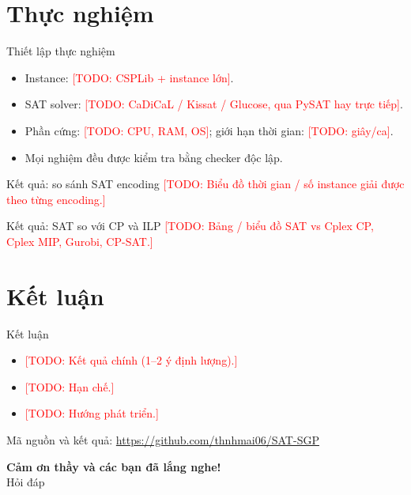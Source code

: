 \documentclass[aspectratio=169,11pt]{beamer}
\newcommand{\TODO}[1]{\textcolor{red}{[TODO: #1]}}
\newcommand{\RepositoryURL}{https://github.com/thnhmai06/SAT-SGP}
\begin{document}
\section{Thực nghiệm}
\begin{frame}{Thiết lập thực nghiệm}
  \begin{itemize}
    \item Instance: \TODO{CSPLib + instance lớn}.
    \item SAT solver: \TODO{CaDiCaL / Kissat / Glucose, qua PySAT hay trực tiếp}.
    \item Phần cứng: \TODO{CPU, RAM, OS}; giới hạn thời gian: \TODO{giây/ca}.
    \item Mọi nghiệm đều được kiểm tra bằng checker độc lập.
  \end{itemize}
\end{frame}

\begin{frame}{Kết quả: so sánh SAT encoding}
  \centering
  \TODO{Biểu đồ thời gian / số instance giải được theo từng encoding.}
\end{frame}

\begin{frame}{Kết quả: SAT so với CP và ILP}
  \centering
  \TODO{Bảng / biểu đồ SAT vs Cplex CP, Cplex MIP, Gurobi, CP-SAT.}
\end{frame}

\section{Kết luận}
\begin{frame}{Kết luận}
  \begin{itemize}
    \item \TODO{Kết quả chính (1--2 ý định lượng).}
    \item \TODO{Hạn chế.}
    \item \TODO{Hướng phát triển.}
  \end{itemize}
  \vspace{1em}
  Mã nguồn và kết quả: \url{\RepositoryURL}
\end{frame}

\begin{frame}[plain]
  \centering
  \vfill
  {\Huge\bfseries\color{navy} Cảm ơn thầy và các bạn đã lắng nghe!}\\[1em]
  Hỏi đáp
  \vfill
\end{frame}
\end{document}
